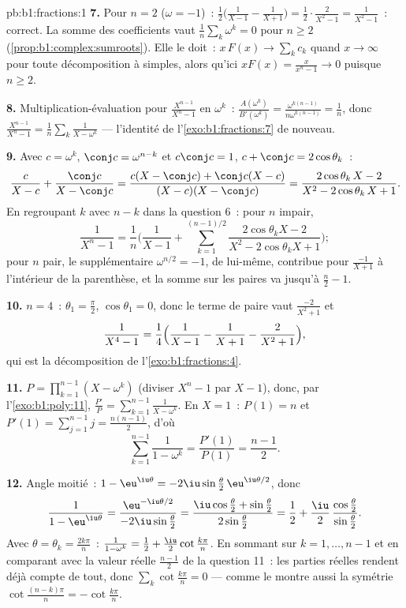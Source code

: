 \begin{solution}{pb:b1:fractions:1}
\textbf{7.} Pour $n = 2$ ($\omega = -1$)~: $\frac12\bigl(
\frac1{X-1} - \frac1{X+1}\bigr) = \frac12\cdot\frac{2}{X^2-1} =
\frac1{X^2-1}$~: correct. La somme des coefficients vaut
$\frac1n\sum_k\omega^k = 0$ pour $n \geq 2$
(\cref{prop:b1:complex:sumroots}). Elle le doit~: $x\,F(x) \to
\sum_k c_k$ quand $x \to \infty$ pour toute décomposition à 
simples, alors qu'ici $xF(x) = \frac{x}{x^n-1} \to 0$ puisque $n \geq
2$.

\textbf{8.} Multiplication-évaluation pour $\frac{X^{n-1}}{X^n - 1}$ en
$\omega^k$~: $\frac{A(\omega^k)}{B'(\omega^k)} =
\frac{\omega^{k(n-1)}}{n\omega^{k(n-1)}} = \frac1n$, donc
$\frac{X^{n-1}}{X^n-1} = \frac1n\sum_k\frac1{X - \omega^k}$ ---
l'identité de l'\cref{exo:b1:fractions:7} de nouveau.

\textbf{9.} Avec $c = \omega^k$, $\conj c = \omega^{n-k}$ et
$c\conj c = 1$, $c + \conj c = 2\cos\theta_k$~:
\[
\frac{c}{X - c} + \frac{\conj c}{X - \conj c}
= \frac{c(X - \conj c) + \conj c(X - c)}
{(X - c)(X - \conj c)}
= \frac{2\cos\theta_k\,X - 2}{X^2 - 2\cos\theta_k\,X + 1} .
\]
En regroupant $k$ avec $n - k$ dans la question 6~: pour $n$ impair,
\[
\frac1{X^n - 1} = \frac1n\Biggl(\frac1{X-1} +
\sum_{k=1}^{(n-1)/2}
\frac{2\cos\theta_k X - 2}{X^2 - 2\cos\theta_k X + 1}\Biggr) ;
\]
pour $n$ pair, le  supplémentaire $\omega^{n/2} = -1$,  de
lui-même, contribue pour $\frac{-1}{X+1}$ à l'intérieur de la
parenthèse, et la somme sur les paires va jusqu'à $\frac n2 - 1$.

\textbf{10.} $n = 4$~: $\theta_1 = \frac\pi2$, $\cos\theta_1 = 0$,
donc le terme de paire vaut $\frac{-2}{X^2+1}$ et
\[
\frac1{X^4-1} = \frac14\Bigl(\frac1{X-1} - \frac1{X+1}
- \frac2{X^2+1}\Bigr) ,
\]
qui est la décomposition de l'\cref{exo:b1:fractions:4}.

\textbf{11.} $P = \prod_{k=1}^{n-1}(X - \omega^k)$ (diviser $X^n -
1$ par $X - 1$), donc, par l'\cref{exo:b1:poly:11}, $\frac{P'}P =
\sum_{k=1}^{n-1}\frac1{X-\omega^k}$. En $X = 1$~: $P(1) = n$ et
$P'(1) = \sum_{j=1}^{n-1}j = \frac{n(n-1)}2$, d'où
\[
\sum_{k=1}^{n-1}\frac1{1 - \omega^k}
= \frac{P'(1)}{P(1)} = \frac{n-1}2 .
\]

\textbf{12.} Angle moitié~: $1 - \eu^{\iu\theta} =
-2\iu\sin\frac\theta2\,\eu^{\iu\theta/2}$, donc
\[
\frac1{1 - \eu^{\iu\theta}}
= \frac{\eu^{-\iu\theta/2}}{-2\iu\sin\frac\theta2}
= \frac{\iu\cos\frac\theta2 + \sin\frac\theta2}
{2\sin\frac\theta2}
= \frac12 + \frac\iu2\,
\frac{\cos\frac\theta2}{\sin\frac\theta2} .
\]
Avec $\theta = \theta_k = \frac{2k\pi}n$~: $\frac1{1-\omega^k} =
\frac12 + \frac\iu2\cot\frac{k\pi}n$. En sommant sur $k = 1, \dots,
n-1$ et en comparant avec la valeur réelle $\frac{n-1}2$ de la
question 11~: les parties réelles rendent déjà compte de tout, donc
$\sum_k\cot\frac{k\pi}n = 0$ --- comme le montre aussi la symétrie
$\cot\frac{(n-k)\pi}n = -\cot\frac{k\pi}n$.


\end{solution}
